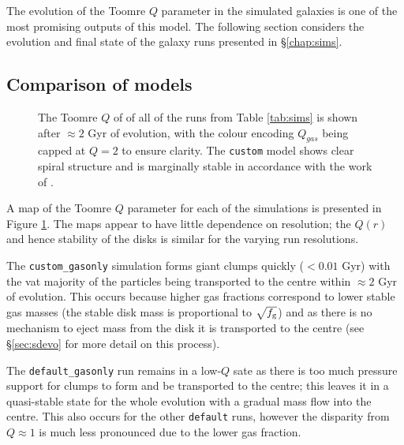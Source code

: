 The evolution of the Toomre $Q$ parameter in the simulated galaxies is one of the most promising outputs of this model.
The following section considers the evolution and final state of the galaxy runs presented in \S \ref{chap:sims}.

\subsection{Comparison of models}

\begin{figure}[!ht]
    \leavevmode\rlap{\usebox{\graphicsbox}}%
    \begin{minipage}[b]{0.63\wd\graphicsbox}%
        \caption{The Toomre $Q$ of of all of the runs from Table \ref{tab:sims} is shown after $\approx 2$ Gyr of evolution, with the colour encoding $Q_{gas}$ being capped at $Q=2$ to ensure clarity. The {\tt custom} model shows clear spiral structure and is marginally stable in accordance with the work of \citet{hopkins_stellar_2012}.}
        \label{fig:toomqsimbigfig}
    \end{minipage}\hspace*{0.33\wd\graphicsbox}%
\end{figure}

A map of the Toomre $Q$ parameter for each of the simulations is presented in Figure \ref{fig:toomqsimbigfig}.
The maps appear to have little dependence on resolution; the $Q(r)$ and hence stability of the disks is similar for the varying run resolutions.

The {\tt custom\_gasonly} simulation forms giant clumps quickly ($<0.01$ Gyr) with the vat majority of the particles being transported to the centre within $\approx 2$ Gyr of evolution.
This occurs because higher gas fractions correspond to lower stable gas masses (the stable disk mass is proportional to $\sqrt{f_\mathrm{g}}$) and as there is no mechanism to eject mass from the disk it is transported to the centre (see \S \ref{sec:sdevo} for more detail on this process).

The {\tt default\_gasonly} run remains in a low-$Q$ sate as there is too much pressure support for clumps to form and be transported to the centre; this leaves it in a quasi-stable state for the whole evolution with a gradual mass flow into the centre.
This also occurs for the other {\tt default} runs, however the disparity from $Q \approx 1$ is much less pronounced due to the lower gas fraction.

